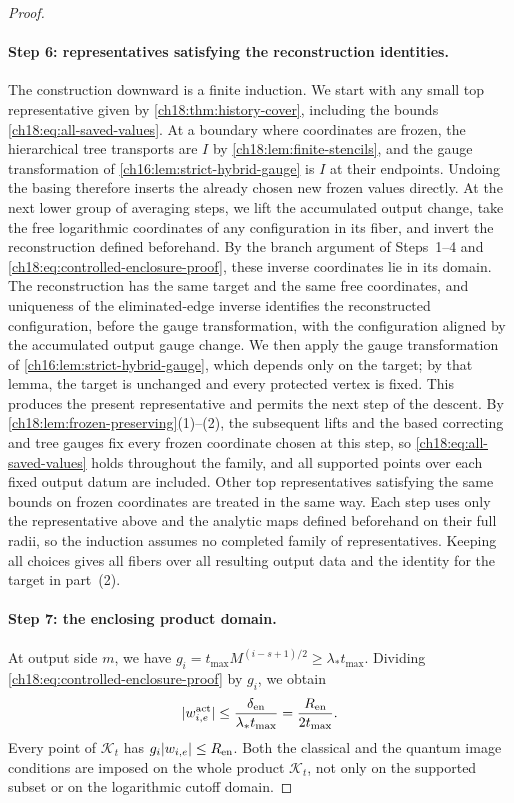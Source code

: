 \begin{proof}
\paragraph{Step 6: representatives satisfying the reconstruction identities.}
The construction downward is a finite induction. We start with any small top representative given by \cref{ch18:thm:history-cover}, including the bounds \eqref{ch18:eq:all-saved-values}. At a boundary where coordinates are frozen, the hierarchical tree transports are $I$ by \cref{ch18:lem:finite-stencils}, and the gauge transformation of \cref{ch16:lem:strict-hybrid-gauge} is $I$ at their endpoints. Undoing the basing therefore inserts the already chosen new frozen values directly. At the next lower group of averaging steps, we lift the accumulated output change, take the free logarithmic coordinates of any configuration in its fiber, and invert the reconstruction defined beforehand. By the branch argument of Steps~1--4 and \eqref{ch18:eq:controlled-enclosure-proof}, these inverse coordinates lie in its domain. The reconstruction has the same target and the same free coordinates, and uniqueness of the eliminated-edge inverse identifies the reconstructed configuration, before the gauge transformation, with the configuration aligned by the accumulated output gauge change. We then apply the gauge transformation of \cref{ch16:lem:strict-hybrid-gauge}, which depends only on the target; by that lemma, the target is unchanged and every protected vertex is fixed. This produces the present representative and permits the next step of the descent. By \cref{ch18:lem:frozen-preserving}(1)--(2), the subsequent lifts and the based correcting and tree gauges fix every frozen coordinate chosen at this step, so \eqref{ch18:eq:all-saved-values} holds throughout the family, and all supported points over each fixed output datum are included. Other top representatives satisfying the same bounds on frozen coordinates are treated in the same way. Each step uses only the representative above and the analytic maps defined beforehand on their full radii, so the induction assumes no completed family of representatives. Keeping all choices gives all fibers over all resulting output data and the identity for the target in part~(2).

\paragraph{Step 7: the enclosing product domain.}
At output side $m$, we have $g_i=t_{\max}M^{(i-s+1)/2}\ge\lambda_*t_{\max}$. Dividing \eqref{ch18:eq:controlled-enclosure-proof} by $g_i$, we obtain
\[
 \lvert w_{i,e}^{\mathrm{act}}\rvert
 \le \frac{\delta_{\mathrm{en}}}
              {\lambda_*t_{\max}}
 =\frac{R_{\mathrm{en}}}{2t_{\max}}.
\]
Every point of $\mathcal K_t$ has $g_i\lvert w_{i,e}\rvert\le R_{\mathrm{en}}$. Both the classical and the quantum image conditions are imposed on the whole product $\mathcal K_t$, not only on the supported subset or on the logarithmic cutoff domain.


\end{proof}
